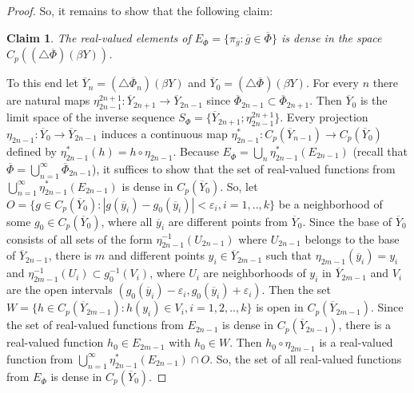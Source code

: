 \documentclass[10pt,a4paper]{amsart}
\newtheorem{claim}{Claim}
\begin{document}
\begin{proof}
So, it remains to show that the following claim:
\begin{claim}
The real-valued elements of $E_{\overline\Phi}=\{\pi_{\overline g}: \overline g\in\overline\Phi\}$ is dense in the space $C_p((\triangle\overline\Phi)(\beta Y))$. 
\end{claim}
To this end let $\overline Y_n=(\triangle\overline\Phi_n)(\beta Y)$ and $\overline Y_0=(\triangle\overline\Phi)(\beta Y)$. For every $n$ there are natural maps $\eta^{2n+1}_{2n-1}:\overline Y_{2n+1}\to \overline Y_{2n-1}$ since $\overline\Phi_{2n-1}\subset\overline\Phi_{2n+1}$. Then 
$\overline Y_0$ is the limit space of the inverse sequence $S_\Phi=\{\overline Y_{2n+1};\eta^{2n+1}_{2n-1}\}$.
Every projection $\eta_{2n-1}:\overline Y_0\to\overline Y_{2n-1}$ induces a continuous map 
$\eta_{2n-1}^*:C_p(\overline Y_{n-1})\to C_p(\overline Y_0)$ defined by $\eta_{2n-1}^*(h)=h\circ\eta_{2n-1}$. 
Because 
$E_{\overline\Phi}=\bigcup_n\eta_{2n-1}^*(E_{2n-1})$ (recall that $\overline\Phi=\bigcup_{n=1}^\infty\overline\Phi_{2n-1}$), it suffices to show that  
the set of real-valued functions from $\bigcup_{n=1}^\infty\eta_{2n-1}^*(E_{2n-1})$ is dense in $C_p(\overline Y_0)$. So, let 
$O=\{g\in C_p(\overline Y_0):|g(\overline y_i)-g_0(\overline y_i)|<\varepsilon_i, i=1,..,k\}$ be a neighborhood of some $g_0\in C_p(\overline Y_0)$, where 
all $\overline y_i$ are different points from $\overline Y_0$. Since the base of $\overline Y_0$ consists of all sets of the form $\eta_{2n-1}^{-1}(U_{2n-1})$ where $U_{2n-1}$ belongs to the base of $\overline Y_{2n-1}$, there is $m$ and different points $y_i\in\overline Y_{2m-1}$ such that $\eta_{2m-1}(\overline y_i)=y_i$ and $\eta_{2m-1}^{-1}(U_i)\subset g_0^{-1}(V_i)$, where $U_i$ are neighborhoods of $y_i$ in $\overline Y_{2m-1}$ and $V_i$ are the open intervals $(g_0(\overline y_i)-\varepsilon_i,g_0(\overline y_i)+\varepsilon_i)$. Then the set $W=\{h\in C_p(\overline Y_{2m-1}):h(y_i)\in V_i, i=1,2,..,k\}$  is open in $C_p(\overline Y_{2m-1})$. Since the set of real-valued functions from $E_{2n-1}$ is dense in $C_p(\overline Y_{2n-1})$, there is a real-valued function
$h_0\in E_{2m-1}$ with $h_0\in W$. Then $h_0\circ\eta_{2m-1}$ is a real-valued function from $\bigcup_{n=1}^\infty\eta_{2n-1}^*(E_{2n-1})\cap O$. So, the set of all real-valued functions from $E_{\overline\Phi}$ is dense in $C_p(\overline Y_0)$.
\end{proof}
\end{document}
